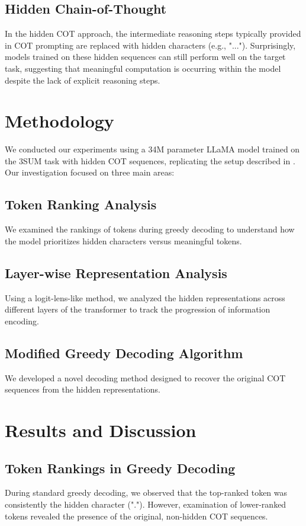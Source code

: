 \documentclass[11pt,a4paper]{article}
\begin{document}
\subsection{Hidden Chain-of-Thought}
In the hidden COT approach, the intermediate reasoning steps typically provided in COT prompting are replaced with hidden characters (e.g., "..."). Surprisingly, models trained on these hidden sequences can still perform well on the target task, suggesting that meaningful computation is occurring within the model despite the lack of explicit reasoning steps.

\section{Methodology}
We conducted our experiments using a 34M parameter LLaMA model trained on the 3SUM task with hidden COT sequences, replicating the setup described in \citet{pfau2024let}. Our investigation focused on three main areas:

\subsection{Token Ranking Analysis}
We examined the rankings of tokens during greedy decoding to understand how the model prioritizes hidden characters versus meaningful tokens.

\subsection{Layer-wise Representation Analysis}
Using a logit-lens-like method, we analyzed the hidden representations across different layers of the transformer to track the progression of information encoding.

\subsection{Modified Greedy Decoding Algorithm}
We developed a novel decoding method designed to recover the original COT sequences from the hidden representations.

\section{Results and Discussion}

\subsection{Token Rankings in Greedy Decoding}
During standard greedy decoding, we observed that the top-ranked token was consistently the hidden character ("."). However, examination of lower-ranked tokens revealed the presence of the original, non-hidden COT sequences.
\end{document}
